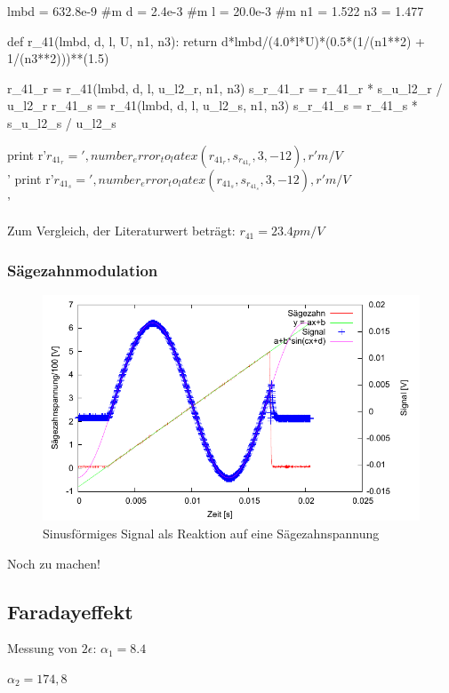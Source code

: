\begin{python}
lmbd = 632.8e-9 #m
d = 2.4e-3 #m
l = 20.0e-3 #m
n1 = 1.522
n3 = 1.477

def r_41(lmbd, d, l, U, n1, n3):
  return d*lmbd/(4.0*l*U)*(0.5*(1/(n1**2) + 1/(n3**2)))**(1.5)

r_41_r = r_41(lmbd, d, l, u_l2_r, n1, n3)
s_r_41_r = r_41_r * s_u_l2_r / u_l2_r
r_41_s = r_41(lmbd, d, l, u_l2_s, n1, n3)
s_r_41_s = r_41_s * s_u_l2_s / u_l2_s

print r'$r_{41_r} = ', number_error_to_latex(r_41_r, s_r_41_r, 3, -12), r' m/V$\\'
print r'$r_{41_s} = ', number_error_to_latex(r_41_s, s_r_41_s, 3, -12), r' m/V$\\'


\end{python}

Zum Vergleich, der Literaturwert beträgt: $r_{41} = 23.4 pm/V$

\subsubsection{Sägezahnmodulation}

\begin{figure}[H]
 \centering
 \includegraphics{messwerte/saegezahn/saegezahn_1.pdf}
 \caption{Sinusförmiges Signal als Reaktion auf eine Sägezahnspannung}
\end{figure}


Noch zu machen!


\subsection{Faradayeffekt}

Messung von $2\epsilon$:
$\alpha_1 = 8.4$

$\alpha_2 = 174,8$

